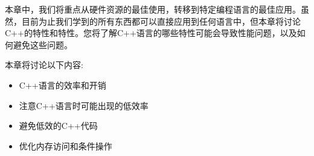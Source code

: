 本章中，我们将重点从硬件资源的最佳使用，转移到特定编程语言的最佳应用。虽然，目前为止我们学到的所有东西都可以直接应用到任何语言中，但本章将讨论C++的特性和特性。您将了解C++语言的哪些特性可能会导致性能问题，以及如何避免这些问题。 

本章将讨论以下内容:

\begin{itemize}
\item
C++语言的效率和开销

\item
注意C++语言时可能出现的低效率

\item
避免低效的C++代码

\item
优化内存访问和条件操作
	
\end{itemize}